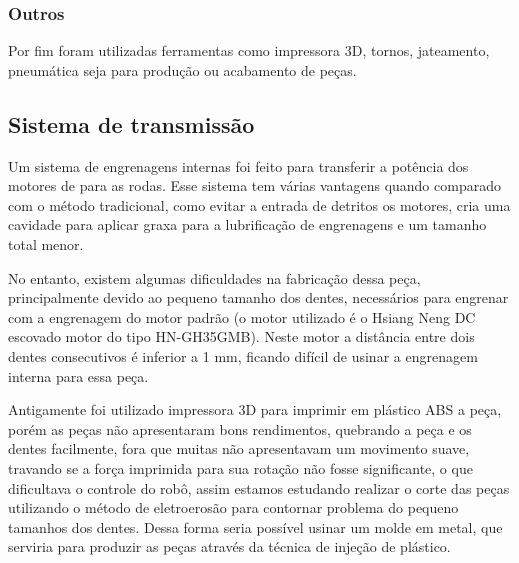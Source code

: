 \documentclass[conference]{IEEEtran}
\begin{document}
\subsubsection{Outros}

Por fim foram utilizadas ferramentas como impressora 3D, tornos, jateamento, pneumática seja para produção ou acabamento de peças.




\subsection{Sistema de transmissão}

Um sistema de engrenagens internas foi feito para transferir a potência dos motores de para as rodas. Esse sistema tem várias vantagens quando comparado com o método tradicional, como evitar a entrada de detritos os motores, cria uma cavidade para aplicar graxa para a lubrificação de engrenagens e um tamanho total menor.

No entanto, existem algumas dificuldades na fabricação dessa peça, principalmente devido ao pequeno tamanho dos dentes, necessários para engrenar com a engrenagem do motor padrão (o motor utilizado é o Hsiang Neng DC escovado motor do tipo HN-GH35GMB). Neste motor a distância entre dois dentes consecutivos é inferior a 1 mm, ficando difícil de usinar a engrenagem interna para essa peça. 

Antigamente foi utilizado impressora 3D para imprimir em plástico ABS a peça, porém as peças não apresentaram bons rendimentos, quebrando a peça e os dentes facilmente, fora que muitas não apresentavam um movimento suave, travando se a força imprimida para sua rotação não fosse significante, o que dificultava o controle do robô, assim estamos estudando realizar o corte das peças utilizando o método de eletroerosão para contornar  problema do pequeno tamanhos dos dentes. Dessa forma seria possível usinar um molde em metal, que serviria para produzir as peças através da técnica de injeção de plástico.
\end{document}
